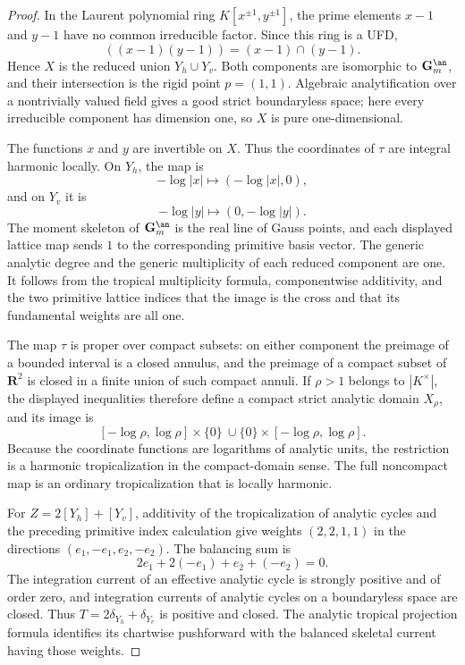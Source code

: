\begin{proof}
In the Laurent polynomial ring $K[x^{\pm1},y^{\pm1}]$, the prime elements
$x-1$ and $y-1$ have no common irreducible factor.  Since this ring is a
UFD,
\[
 ((x-1)(y-1))=(x-1)\cap(y-1).
\]
Hence $X$ is the reduced union $Y_h\cup Y_v$.  Both components are
isomorphic to $\mathbf G_m^{\an}$, and their intersection is the rigid
point $p=(1,1)$.  Algebraic analytification over a nontrivially valued
field gives a good strict boundaryless space; here every irreducible
component has dimension one, so $X$ is pure one-dimensional.

The functions $x$ and $y$ are invertible on $X$.  Thus the coordinates of
$\tau$ are integral harmonic locally.  On $Y_h$, the map is
\[
 -\log|x|\longmapsto(-\log|x|,0),
\]
and on $Y_v$ it is
\[
 -\log|y|\longmapsto(0,-\log|y|).
\]
The moment skeleton of $\mathbf G_m^{\an}$ is the real line of Gauss
points, and each displayed lattice map sends $1$ to the corresponding
primitive basis vector.  The generic analytic degree and the generic
multiplicity of each reduced component are one.  It follows from the
tropical multiplicity formula, componentwise additivity, and the two
primitive lattice indices that the image is the cross and that its
fundamental weights are all one.

The map $\tau$ is proper over compact subsets: on either component the
preimage of a bounded interval is a closed annulus, and the preimage of a
compact subset of $\mathbf R^2$ is closed in a finite union of such compact
annuli.  If $\rho>1$ belongs to $|K^\times|$, the displayed inequalities
therefore define a compact strict analytic domain $X_\rho$, and its image is
\[
 [-\log\rho,\log\rho]\times\{0\}
 \ \cup
 \{0\}\times[-\log\rho,\log\rho].
\]
Because the coordinate functions are logarithms of analytic units, the
restriction is a harmonic tropicalization in the compact-domain sense.
The full noncompact map is an ordinary tropicalization that is locally
harmonic.

For $Z=2[Y_h]+[Y_v]$, additivity of the tropicalization of analytic cycles
and the preceding primitive index calculation give weights
$(2,2,1,1)$ in the directions $(e_1,-e_1,e_2,-e_2)$.  The balancing sum is
\[
 2e_1+2(-e_1)+e_2+(-e_2)=0.
\]
The integration current of an effective analytic cycle is strongly
positive and of order zero, and integration currents of analytic cycles on
a boundaryless space are closed.  Thus
$T=2\delta_{Y_h}+\delta_{Y_v}$ is positive and closed.  The analytic
tropical projection formula identifies its chartwise pushforward with the
balanced skeletal current having those weights.


\end{proof}
